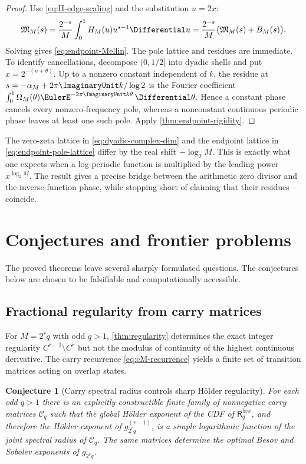 \documentclass[11pt,oneside]{article}
\newtheorem{conjecture}[theorem]{Conjecture}
\theoremstyle{definition}
\theoremstyle{remark}
\newcommand{\ReciprocalIntegerLaw}[1]{\mathsf R^{\mathrm{law}}_{#1}}
\begin{document}
\begin{proof}
Use \eqref{eq:H-edge-scaling} and the substitution $u=2x$:
\[
 \mathfrak M_M(s)
 =\frac{2^{-s}}M\int_0^1H_M(u)u^{s-1}\Differential u
 =\frac{2^{-s}}M\bigl(\mathfrak M_M(s)+B_M(s)\bigr).
\]
Solving gives \eqref{eq:endpoint-Mellin}.  The pole lattice and residues are immediate.
To identify cancellations, decompose $(0,1/2]$ into dyadic shells and put
$x=2^{-(n+\theta)}$.  Up to a nonzero constant independent of $k$, the residue at
$s=-\alpha_M+2\pi\ImaginaryUnit k/\log2$ is the Fourier coefficient
$\int_0^1\Omega_M(\theta)\EulerE^{-2\pi\ImaginaryUnit k\theta}\,\Differential\theta$.  Hence a constant
phase cancels every nonzero-frequency pole, whereas a nonconstant continuous periodic
phase leaves at least one such pole.  Apply \cref{thm:endpoint-rigidity}.
\end{proof}

The zero-zeta lattice in \eqref{eq:dyadic-complex-dim} and the endpoint lattice in
\eqref{eq:endpoint-pole-lattice} differ by the real shift $-\log_2M$.  This is exactly what
one expects when a log-periodic function is multiplied by the leading power
$x^{\log_2M}$.  The result gives a precise bridge between the arithmetic zero divisor and
the inverse-function phase, while stopping short of claiming that their residues coincide.

\section{Conjectures and frontier problems}
\label{sec:conjectures}

The proved theorems leave several sharply formulated questions.  The conjectures below are
chosen to be falsifiable and computationally accessible.

\subsection{Fractional regularity from carry matrices}

For $M=2^rq$ with odd $q>1$, \cref{thm:regularity} determines the exact integer
regularity $C^{r-1}\setminus C^r$ but not the modulus of continuity of the highest
continuous derivative.  The carry recurrence \eqref{eq:cM-recurrence} yields a finite set
of transition matrices acting on overlap states.

\begin{conjecture}[Carry spectral radius controls sharp H\"older regularity]
\label{conj:carry-regularity}
For each odd $q>1$ there is an explicitly constructible finite family of nonnegative carry
matrices $\mathscr C_q$ such that the global H\"older exponent of the CDF of $\ReciprocalIntegerLaw{q}$, and
therefore the H\"older exponent of $g_{2^rq}^{(r-1)}$, is a simple logarithmic function of the
joint spectral radius of $\mathscr C_q$.  The same matrices determine the optimal Besov and
Sobolev exponents of $g_{2^rq}$.
\end{conjecture}
\end{document}
